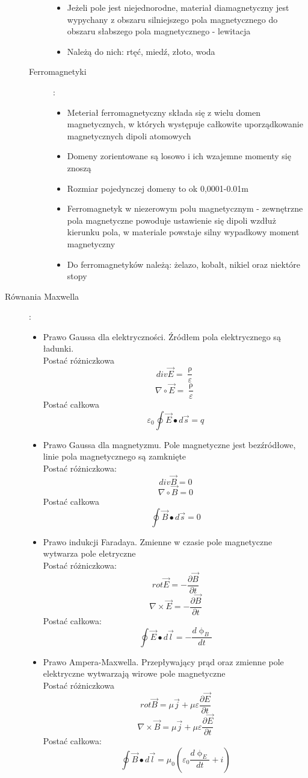 \documentclass[a4paper,11pt]{article}
\begin{document}
\begin{description}
\begin{description}
\begin{itemize}
    \item Jeżeli pole jest niejednorodne, materiał diamagnetyczny jest wypychany z obszaru silniejszego pola magnetycznego do obszaru słabszego pola magnetycznego - lewitacja
    \item Należą do nich: rtęć, miedź, złoto, woda
    \end{itemize}
  \item[Ferromagnetyki]:\\
    \begin{itemize}
    \item Meteriał ferromagnetyczny składa się z wielu domen magnetycznych, w których występuje całkowite uporządkowanie magnetycznych dipoli atomowych
    \item Domeny zorientowane są losowo i ich wzajemne momenty się znoszą
    \item Rozmiar pojedynczej domeny to ok 0,0001-0.01m
    \item Ferromagnetyk w niezerowym polu magnetycznym - zewnętrzne pola magnetyczne powoduje ustawienie się dipoli wzdłuż kierunku pola, w materiale powstaje silny wypadkowy moment magnetyczny
    \item Do ferromagnetyków należą: żelazo, kobalt, nikiel oraz niektóre stopy
    \end{itemize}
  \end{description}
\item[Równania Maxwella]:\\
  \begin{itemize}
  \item Prawo Gaussa dla elektryczności. Źródłem pola elektrycznego są ładunki. \\
    Postać różniczkowa
    $$div\vec{E}=\frac{\uprho}{\varepsilon}$$
    $$\nabla \circ \vec{E}=\frac{\uprho}{\varepsilon}$$
    Postać całkowa
    $$\varepsilon_0\oint\vec{E}\bullet d\vec{s} = q$$
  \item Prawo Gaussa dla magnetyzmu. Pole magnetyczne jest bezźródłowe, linie pola magnetycznego są zamknięte \\
    Postać różniczkowa:
    $$div\vec{B}=0$$
    $$\nabla\circ\vec{B}=0$$
    Postać całkowa
    $$\oint\vec{B}\bullet d\vec{s} = 0$$
  \item Prawo indukcji Faradaya. Zmienne w czasie pole magnetyczne wytwarza pole eletryczne\\
    Postać różniczkowa:
    $$rot \vec{E} = -\frac{\partial\vec{B}}{\partial t}$$
    $$\nabla\times\vec{E}=-\frac{\partial\vec{B}}{\partial t}$$
    Postać całkowa:
    $$\oint\vec{E}\bullet d\vec{l} = -\frac{d\upphi_B}{dt}$$
  \item Prawo Ampera-Maxwella. Przepływający prąd oraz zmienne pole elektryczne wytwarzają wirowe pole magnetyczne\\
    Postać różniczkowa
    $$rot\vec{B}=\mu\vec{j}+\mu\varepsilon\frac{\partial\vec{E}}{\partial t}$$
    $$\nabla\times\vec{B}=\mu\vec{j}+\mu\varepsilon\frac{\partial\vec{E}}{\partial t}$$
    Postać całkowa:
    $$\oint\vec{B}\bullet d\vec{l} = \mu_0\left(\varepsilon_0\frac{d\upphi_E}{dt} +i\right)$$


\end{itemize}
\end{description}
\end{document}
